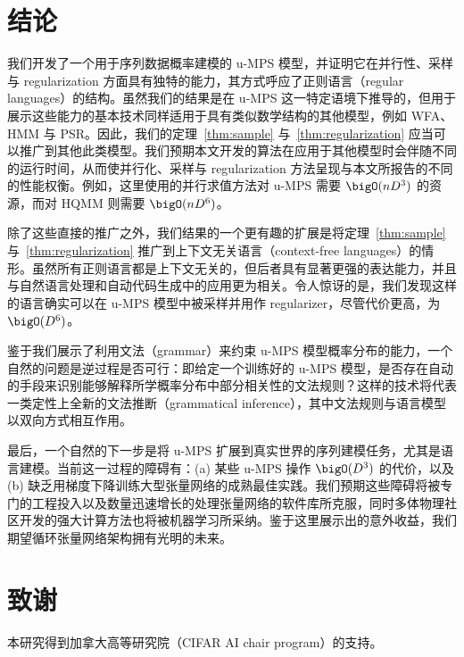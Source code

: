 \section{结论}

我们开发了一个用于序列数据概率建模的 u-MPS 模型，并证明它在并行性、采样与 regularization 方面具有独特的能力，其方式呼应了正则语言（regular languages）的结构。虽然我们的结果是在 u-MPS 这一特定语境下推导的，但用于展示这些能力的基本技术同样适用于具有类似数学结构的其他模型，例如 WFA、HMM 与 PSR。因此，我们的定理~\ref{thm:sample} 与~\ref{thm:regularization} 应当可以推广到其他此类模型。我们预期本文开发的算法在应用于其他模型时会伴随不同的运行时间，从而使并行化、采样与 regularization 方法呈现与本文所报告的不同的性能权衡。例如，这里使用的并行求值方法对 u-MPS 需要 $\bigO(n D^3)$ 的资源，而对 HQMM 则需要 $\bigO(n D^6)$。

除了这些直接的推广之外，我们结果的一个更有趣的扩展是将定理~\ref{thm:sample} 与~\ref{thm:regularization} 推广到上下文无关语言（context-free languages）的情形。虽然所有正则语言都是上下文无关的，但后者具有显著更强的表达能力，并且与自然语言处理和自动代码生成中的应用更为相关。令人惊讶的是，我们发现这样的语言确实可以在 u-MPS 模型中被采样并用作 regularizer，尽管代价更高，为 $\bigO(D^6)$。

鉴于我们展示了利用文法（grammar）来约束 u-MPS 模型概率分布的能力，一个自然的问题是逆过程是否可行：即给定一个训练好的 u-MPS 模型，是否存在自动的手段来识别能够解释所学概率分布中部分相关性的文法规则？这样的技术将代表一类定性上全新的文法推断（grammatical inference），其中文法规则与语言模型以双向方式相互作用。

最后，一个自然的下一步是将 u-MPS 扩展到真实世界的序列建模任务，尤其是语言建模。当前这一过程的障碍有：(a) 某些 u-MPS 操作 $\bigO(D^3)$ 的代价，以及 (b) 缺乏用梯度下降训练大型张量网络的成熟最佳实践。我们预期这些障碍将被专门的工程投入以及数量迅速增长的处理张量网络的软件库所克服，同时多体物理社区开发的强大计算方法也将被机器学习所采纳。鉴于这里展示出的意外收益，我们期望循环张量网络架构拥有光明的未来。

\section*{致谢}
本研究得到加拿大高等研究院（CIFAR AI chair program）的支持。

\appendix
\onecolumn

